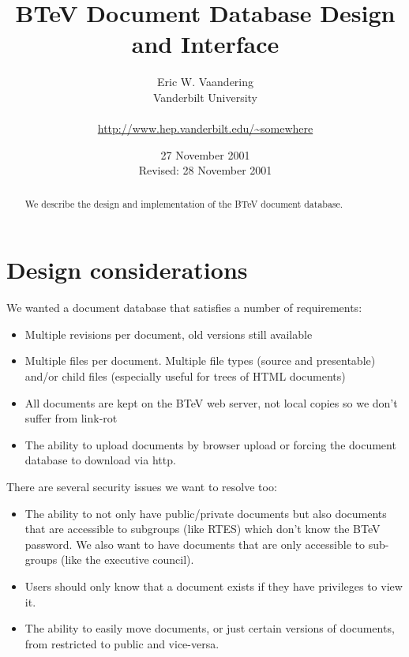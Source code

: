 \documentclass[12pt]{article}
\begin{document}
                                                 

\title{BTeV Document Database Design and Interface}

\author{
        Eric W. Vaandering\\  
        Vanderbilt University\\
        \\
        {\small\url{http://www.hep.vanderbilt.edu/~somewhere}}
       }
        

\date{27 November 2001 \\
      Revised: 28 November 2001}

\maketitle

\begin{abstract} 
We describe the design and implementation of the BTeV document
database.\end{abstract}

\section{Design considerations}

We wanted a document database that satisfies a number of requirements:
\begin{itemize}
\item{Multiple revisions per document, old versions still available}
\item{Multiple files per document. Multiple file types (source and 
presentable) and/or child files (especially useful for trees of HTML 
documents)}
\item{All documents are kept on the BTeV web server, not local copies 
so we don't suffer from link-rot}
\item{The ability to upload documents by browser upload or forcing the 
document database to download via http.}
\end{itemize}

There are several security issues we want to resolve too:
\begin{itemize}
\item{The ability to not only have public/private documents but also 
documents that are accessible to subgroups (like RTES) which don't know 
the BTeV password. We also want to have documents that are only 
accessible to sub-groups (like the executive council).}
\item{Users should only know that a document exists if they have 
privileges to view it.}
\item{The ability to easily move documents, or just certain versions of 
documents, from restricted to public and vice-versa.}
\end{itemize}
\end{document}
